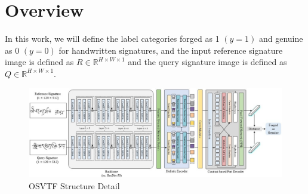 \section{Overview}
In this work, we will define the label categories forged as 1 $(y=1)$ and genuine as 0 $(y=0)$ for handwritten signatures, and the input reference signature image is defined as $R \in \mathbb{R}^{H\times W\times 1}$ and the query signature image is defined as $Q \in \mathbb{R}^{H\times W\times 1}$.

\begin{figure}[htbp]
  \begin{center}
      \includegraphics[scale=0.46]{figure/osvtf.jpg}
  \end{center}
  \caption{OSVTF Structure Detail}
  \label{fig:osvtf}
\end{figure}

